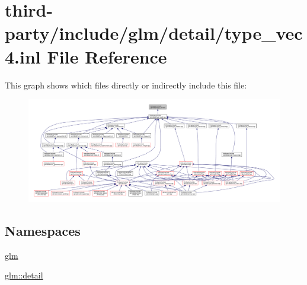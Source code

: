 \hypertarget{type__vec4_8inl}{}\section{third-\/party/include/glm/detail/type\+\_\+vec4.inl File Reference}
\label{type__vec4_8inl}
This graph shows which files directly or indirectly include this file\+:
\nopagebreak
\begin{figure}[H]
\begin{center}
\leavevmode
\includegraphics[width=350pt]{type__vec4_8inl__dep__incl}
\end{center}
\end{figure}
\subsection*{Namespaces}
\begin{DoxyCompactItemize}
\item 
 \hyperlink{namespaceglm}{glm}
\item 
 \hyperlink{namespaceglm_1_1detail}{glm\+::detail}
\end{DoxyCompactItemize}

